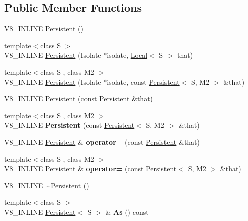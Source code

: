 \subsection*{Public Member Functions}
\begin{DoxyCompactItemize}
\item 
V8\+\_\+\+I\+N\+L\+I\+NE \mbox{\hyperlink{classv8_1_1Persistent_a5ce14612215393683d814056015a102d}{Persistent}} ()
\item 
{\footnotesize template$<$class S $>$ }\\V8\+\_\+\+I\+N\+L\+I\+NE \mbox{\hyperlink{classv8_1_1Persistent_aabe9a42d7971bd31173bca34186d9ac2}{Persistent}} (Isolate $\ast$isolate, \mbox{\hyperlink{classv8_1_1Local}{Local}}$<$ S $>$ that)
\item 
{\footnotesize template$<$class S , class M2 $>$ }\\V8\+\_\+\+I\+N\+L\+I\+NE \mbox{\hyperlink{classv8_1_1Persistent_aaf9eb7c4e6d0ef2c81a2c08238653578}{Persistent}} (Isolate $\ast$isolate, const \mbox{\hyperlink{classv8_1_1Persistent}{Persistent}}$<$ S, M2 $>$ \&that)
\item 
V8\+\_\+\+I\+N\+L\+I\+NE \mbox{\hyperlink{classv8_1_1Persistent_a22331e91572784cd5ed5519739bb50c7}{Persistent}} (const \mbox{\hyperlink{classv8_1_1Persistent}{Persistent}} \&that)
\item 
\mbox{\label{classv8_1_1Persistent_ace17fd143fb6414d305871bf0a53ef57}} 
{\footnotesize template$<$class S , class M2 $>$ }\\V8\+\_\+\+I\+N\+L\+I\+NE {\bfseries Persistent} (const \mbox{\hyperlink{classv8_1_1Persistent}{Persistent}}$<$ S, M2 $>$ \&that)
\item 
\mbox{\label{classv8_1_1Persistent_aa1db9923b3212fb8ce57868217858b39}} 
V8\+\_\+\+I\+N\+L\+I\+NE \mbox{\hyperlink{classv8_1_1Persistent}{Persistent}} \& {\bfseries operator=} (const \mbox{\hyperlink{classv8_1_1Persistent}{Persistent}} \&that)
\item 
\mbox{\label{classv8_1_1Persistent_a11104ee8739cb1f25e40fd17d746b48f}} 
{\footnotesize template$<$class S , class M2 $>$ }\\V8\+\_\+\+I\+N\+L\+I\+NE \mbox{\hyperlink{classv8_1_1Persistent}{Persistent}} \& {\bfseries operator=} (const \mbox{\hyperlink{classv8_1_1Persistent}{Persistent}}$<$ S, M2 $>$ \&that)
\item 
V8\+\_\+\+I\+N\+L\+I\+NE \mbox{\hyperlink{classv8_1_1Persistent_a7d4d2bebfe3919e447e22adc15464e25}{$\sim$\+Persistent}} ()
\item 
\mbox{\label{classv8_1_1Persistent_a842282b8cb50699f99c5e415230926ee}} 
{\footnotesize template$<$class S $>$ }\\V8\+\_\+\+I\+N\+L\+I\+NE \mbox{\hyperlink{classv8_1_1Persistent}{Persistent}}$<$ S $>$ \& {\bfseries As} () const
\end{DoxyCompactItemize}
